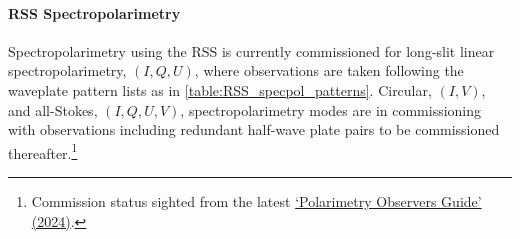 

\paragraph{\gls{RSS} Spectropolarimetry} \label{sec:RSS_reductions}

Spectropolarimetry using the \gls{RSS} is currently commissioned for long-slit linear spectro\-polarimetry, $(I, Q, U)$, where observations are taken following the waveplate pattern lists as in \autoref{table:RSS_specpol_patterns}. Circular, $(I, V)$, and all-Stokes, $(I, Q, U, V)$, spectropolarimetry modes are in commissioning with observations including redundant half-wave plate pairs to be commissioned thereafter.\footnote{Commission status sighted from the latest \href{https://pysalt.salt.ac.za/proposal_calls/current/ProposalCall.html}{`Polarimetry Observers Guide' (2024)}.}


